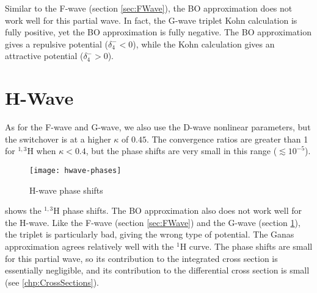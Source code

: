 \documentclass[Dissertation.tex]{subfiles}
\begin{document}
Similar to the F-wave (section \ref{sec:FWave}), the BO approximation 
does not work well for this partial wave. In fact, the G-wave triplet Kohn 
calculation is fully positive, yet the BO approximation is fully negative. 
The BO approximation gives a repulsive potential
($\delta_4^- < 0$), while the Kohn calculation gives an attractive potential
($\delta_4^- > 0$).


\section{H-Wave}
\label{sec:HWave}

As for the F-wave and G-wave, we also use the D-wave nonlinear
parameters, but the switchover is at a higher $\kappa$ of $0.45$.
The convergence ratios are greater than 1 for $^{1,3}$H when
$\kappa < 0.4$, but the phase shifts are very small in this range
($\lesssim 10^{-5}$). 

\begin{figure}
	\centering
	\texttt{[image: hwave-phases]}
	\caption{H-wave phase shifts}
	\label{fig:HWavePhase}
\end{figure}


 shows the $^{1,3}$H phase shifts.
The BO approximation also does not work well for the H-wave. Like 
the F-wave (section \ref{sec:FWave}) and the G-wave (section \ref{sec:HWave}),
the triplet is particularly bad, giving the wrong type of potential.
The Ganas approximation agrees relatively well with the $^1$H curve. The 
phase shifts are small for this partial wave, so its contribution to the 
integrated cross section is essentially negligible, and its contribution
to the differential cross section is small (see \cref{chp:CrossSections}).
\end{document}
